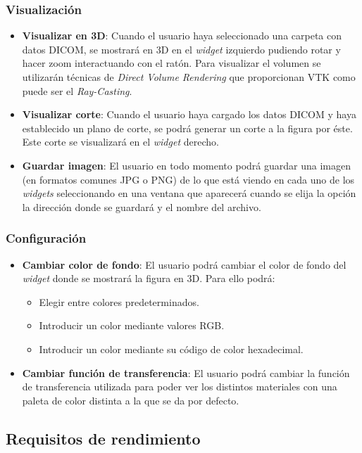		\subsubsection{Visualización}
		\begin{itemize}
			\item \textbf{Visualizar en 3D}: Cuando el usuario haya seleccionado una carpeta con datos DICOM, se mostrará en 3D en el \textit{widget} izquierdo pudiendo rotar y hacer zoom interactuando con el ratón. Para visualizar el volumen se utilizarán técnicas de \textit{Direct Volume Rendering} que proporcionan VTK como puede ser el \textit{Ray-Casting}.
			\item \textbf{Visualizar corte}: Cuando el usuario haya cargado los datos DICOM y haya establecido un plano de corte, se podrá generar un corte a la figura por éste. Este corte se visualizará en el \textit{widget} derecho.
			\item \textbf{Guardar imagen}: El usuario en todo momento podrá guardar una imagen (en formatos comunes JPG o PNG) de lo que está viendo en cada uno de los \textit{widgets} seleccionando en una ventana que aparecerá cuando se elija la opción la dirección donde se guardará y el nombre del archivo. 
		\end{itemize}
	
		\subsubsection{Configuración}
		\begin{itemize}
			\item \textbf{Cambiar color de fondo}: El usuario podrá cambiar el color de fondo del \textit{widget} donde se mostrará la figura en 3D. Para ello podrá:
			\begin{itemize}
				\item Elegir entre colores predeterminados.
				\item Introducir un color mediante valores RGB.
				\item Introducir un color mediante su código de color hexadecimal.
			\end{itemize}
			\item \textbf{Cambiar función de transferencia}: El usuario podrá cambiar la función de transferencia utilizada para poder ver los distintos materiales con una paleta de color distinta a la que se da por defecto.
		\end{itemize}
	
	\subsection{Requisitos de rendimiento}
	
